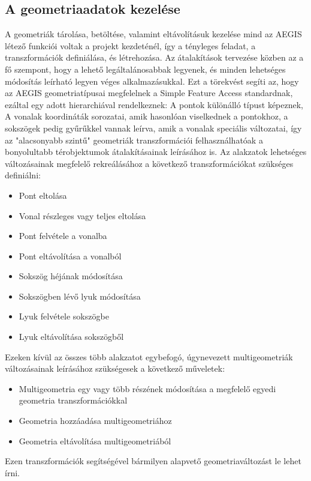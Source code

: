 \subsection{A geometriaadatok kezelése}
A geometriák tárolása, betöltése, valamint eltávolításuk kezelése mind az AEGIS létező funkciói voltak a projekt kezdeténél, így a tényleges feladat, a transzformációk definiálása, és létrehozása.
Az átalakítások tervezése közben az a fő szempont, hogy a lehető legáltalánosabbak legyenek, és minden lehetséges módosítás leírható legyen véges alkalmazásukkal. Ezt a törekvést segíti az, hogy az AEGIS geometriatípusai megfelelnek a Simple Feature Access standardnak, ezáltal egy adott hierarchiával rendelkeznek: A pontok különálló típust képeznek, A vonalak koordináták sorozatai, amik hasonlóan viselkednek a pontokhoz, a sokszögek pedig gyűrűkkel vannak leírva, amik a vonalak speciális változatai, így az "alacsonyabb szintű" geometriák transzformációi felhasználhatóak a bonyolultabb térobjektumok átalakításainak leírásához is. Az alakzatok lehetséges változásainak megfelelő rekreálásához a következő transzformációkat szükséges definiálni:
\begin{itemize}
	\item Pont eltolása
	\item Vonal részleges vagy teljes eltolása
	\item Pont felvétele a vonalba
	\item Pont eltávolítása a vonalból
	\item Sokszög héjának módosítása
	\item Sokszögben lévő lyuk módosítása
	\item Lyuk felvétele sokszögbe
	\item Lyuk eltávolítása sokszögből
\end{itemize}
Ezeken kívül az összes több alakzatot egybefogó, úgynevezett multigeometriák változásainak leírásához szükségesek a következő műveletek:
\begin{itemize}
	\item Multigeometria egy vagy több részének módosítása a megfelelő egyedi geometria transzformációkkal
	\item Geometria hozzáadása multigeometriához
	\item Geometria eltávolítása multigeometriából
\end{itemize}
Ezen transzformációk segítségével bármilyen alapvető geometriaváltozást le lehet írni.

